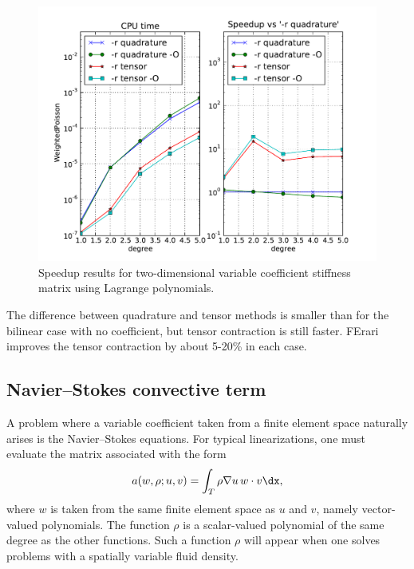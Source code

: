 \begin{figure}
  \begin{center}
    \includegraphics[width=12cm]{chapters/kirby-3/pdf/WeightedPoisson.pdf}
    \caption{Speedup results for two-dimensional variable coefficient
    stiffness matrix using Lagrange polynomials.}
    \label{fig:WeightedPoisson}
  \end{center}
\end{figure}
The difference between quadrature and tensor methods is smaller than
for the bilinear case with no coefficient, but tensor contraction is
still faster. FErari improves the tensor contraction by about 5-20\%
in each case.

\subsection{Navier--Stokes convective term}

A problem where a variable coefficient taken from a finite element
space naturally arises is the Navier--Stokes equations. For typical
linearizations, one must evaluate the matrix associated with the form
\begin{equation}
  a(w, \rho; u, v) = \int_T \rho \nabla u \, w \cdot v \dx,
\end{equation}
where $ w $ is taken from the same finite element space as $ u $ and $
v $, namely vector-valued polynomials. The function $ \rho $ is a
scalar-valued polynomial of the same degree as the other
functions. Such a function $ \rho $ will appear when one solves
problems with a spatially variable fluid density.

